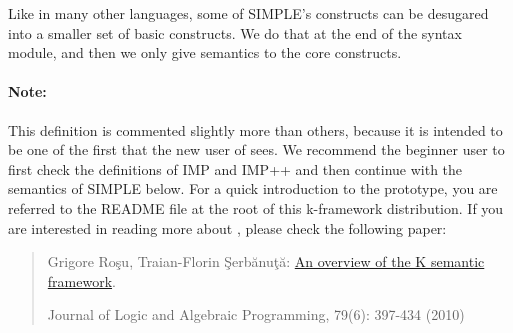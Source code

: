 \begin{latexComment}
\begin{itemize}
\end{itemize}
Like in many other languages, some of SIMPLE's constructs can be
desugared into a smaller set of basic constructs.  We do that at the end
of the syntax module, and then we only give semantics to the core constructs.

\paragraph{Note:}{
This definition is commented slightly more than others, because it is
intended to be one of the first that the new user of \K sees.
We recommend the beginner user to first check the \K definitions of
IMP and IMP++ and then continue with the semantics of SIMPLE below.
For a quick introduction to the \K prototype, you are referred to
the README file at the root of this k-framework distribution.  If you are
interested in reading more about \K, please check the following paper:
\begin{quote}
Grigore Ro\c su, Traian-Florin \c Serb\u anu\c t\u a:
\href{http://dx.doi.org/10.1016/j.jlap.2010.03.012}{An overview of the K semantic framework}.

Journal of Logic and Algebraic Programming, 79(6): 397-434 (2010)
\end{quote}
}
\end{latexComment}

\vspace*{3ex}
